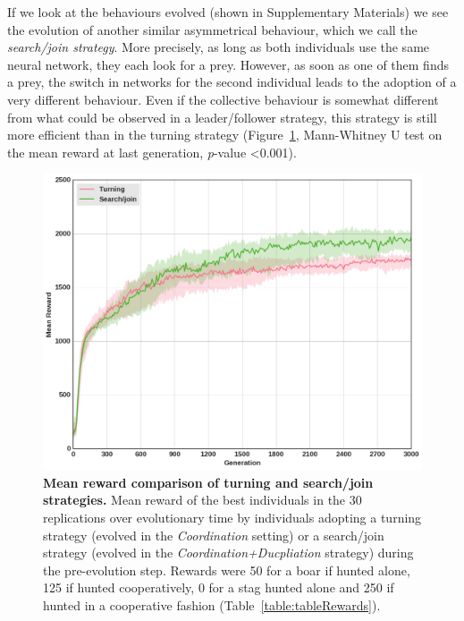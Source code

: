     If we look at the behaviours evolved (shown in Supplementary Materials) we see the evolution of another similar asymmetrical behaviour, which we call the \emph{search/join strategy}. More precisely, as long as both individuals use the same neural network, they each look for a prey. However, as soon as one of them finds a prey, the switch in networks for the second individual leads to the adoption of a very different behaviour. Even if the collective behaviour is somewhat different from what could be observed in a leader/follower strategy, this strategy is still more efficient than in the turning strategy (Figure~\ref{fig:fitnessRecyclingComNN}, Mann-Whitney U test on the mean reward at last generation, {\em p}-value \textless 0.001).

    \begin{figure}[h]
      \centering
        \includegraphics[width=0.7\linewidth]{fig/ArticleBio2/Fig8.png}
        \caption{\textbf{Mean reward comparison of turning and search/join strategies.}
        Mean reward of the best individuals in the $30$ replications over evolutionary time by individuals adopting a turning strategy (evolved in the \emph{Coordination} setting) or a search/join strategy (evolved in the \emph{Coordination+Ducpliation} strategy) during the pre-evolution step. Rewards were 50 for a boar if hunted alone, 125 if hunted cooperatively, 0 for a stag hunted alone and 250 if hunted in a cooperative fashion (Table~\ref{table:tableRewards}).}
      \label{fig:fitnessRecyclingComNN}
    \end{figure} 


